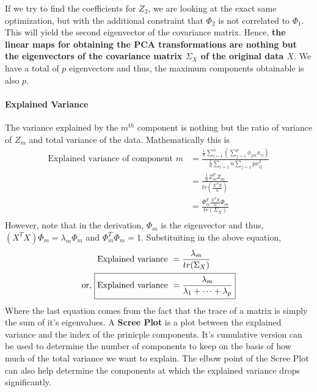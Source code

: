 \documentclass[../statistical_learning_notes.tex]{subfiles}
\begin{document}
    If we try to find the coefficients for $Z_{2}$, we are looking at the exact same optimization, but with the additional constraint that $\Phi_{2}$ is not correlated to $\Phi_{1}$. This will yield the second eigenvector of the covariance matrix. \newline
    Hence, \textbf{the linear maps for obtaining the PCA transformations are nothing but the eigenvectors of the covariance matrix $\Sigma_{X}$ of the original data $X$}. We have a total of $p$ eigenvectors and thus, the maximum components obtainable is also $p$.

    \paragraph{Explained Variance}
    The variance explained by the $m^{th}$ component is nothing but the ratio of variance of $Z_{m}$ and total variance of the data. Mathematically this is
    \begin{align*}
        \text{Explained variance of component } m &= \frac{\frac{1}{n}\sum_{i=1}^{n} (\sum_{j=1}^{p} \phi_{jm} x_{ij})}{\frac{1}{n}\sum_{i=1}{n} \sum_{j=1}{p} x_{ij}^2}\\
                &= \frac{\frac{1}{n}Z_{m}^{T}Z_{m}}{tr(\frac{X^{T}X}{n})}\\
                &= \frac{\Phi_{m}^{T}\frac{X^{T}X}{n}\Phi_{m}}{tr(\Sigma_{X})}\\
    \end{align*}
    However, note that in the derivation, $\Phi_{m}$ is the eigenvector and thus, $(X^{T}X)\Phi_{m} = \lambda_{m}\Phi_{m}$ and $\Phi_{m}^{T}\Phi_{m} = 1$. Substituiting in the above equation,
    \begin{align*}
        \text{Explained variance } &= \frac{\lambda_{m}}{tr(\Sigma_{X})}\\
        \text{or, } \Aboxed{\text{Explained variance } &= \frac{\lambda_{m}}{\lambda_{1} + \cdots +\lambda_{p}}}
    \end{align*}
    Where the last equation comes from the fact that the trace of a matrix is simply the sum of it's eigenvalues.\newline
    A \textbf{Scree Plot} is a plot between the explained variance and the index of the prinicple components. It's cumulative version can be used to determine the number of components to keep on the basis of how much of the total variance we want to explain. The elbow point of the Scree Plot can also help determine the components at which the explained variance drops significantly.
\end{document}
